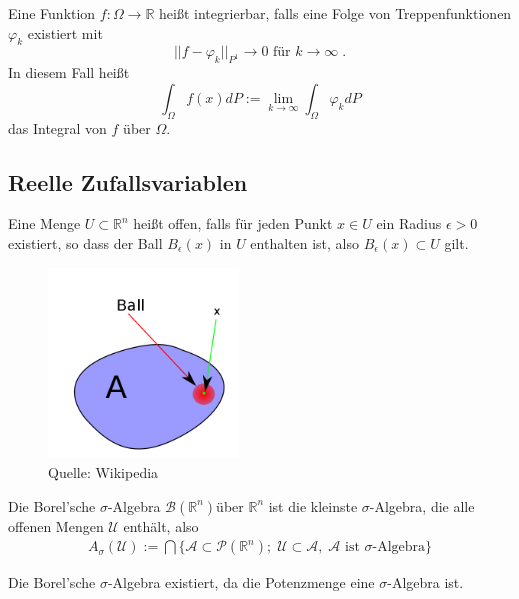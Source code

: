 \begin{Definition}
Eine Funktion $f : \Omega \to \mathbb{R}$ heißt integrierbar, falls eine Folge von Treppenfunktionen  $\varphi_k$ existiert mit
$$ || f -  \varphi_k ||_{P^1} \to 0 \text{ für } k \to \infty \;. $$
In diesem Fall heißt
$$ \int_{\Omega} f(x) dP := \lim_{k \to \infty}  \int_{\Omega}  \varphi_k  dP$$
das Integral von $f$ über $\Omega$.
\end{Definition}


\subsection{Reelle Zufallsvariablen}

\begin{Definition}
Eine Menge $U \subset  \mathbb{R}^n$ heißt offen, falls für jeden Punkt $x \in U$ ein Radius $\epsilon > 0$ existiert, so dass der Ball $B_\epsilon (x)$ in $U$ enthalten ist, also 
$B_\epsilon (x) \subset U$ gilt.
\end{Definition}

\begin{figure}[htp]
      \centering
    \includegraphics[width=0.45\textwidth]{images/openset}
      \caption{Quelle: Wikipedia}
\end{figure}


\begin{Definition}
Die Borel'sche   $\sigma$-Algebra $\mathcal{B}(\mathbb{R}^n)$über $\mathbb{R}^n$ ist die kleinste  $\sigma$-Algebra, die alle offenen Mengen $\mathcal{U}$ enthält, also 
\begin{align*}
A_\sigma (\mathcal{U}) := \bigcap \{  \mathcal{A} \subset \mathcal{P}(\mathbb{R}^n);  \;   \mathcal{U}  \subset  \mathcal{A},  \;  \mathcal{A} \text{ ist $\sigma$-Algebra} \}
\end{align*}
\end{Definition}

\begin{Satz}
Die Borel'sche   $\sigma$-Algebra existiert, da die Potenzmenge eine   $\sigma$-Algebra ist.
\end{Satz}

